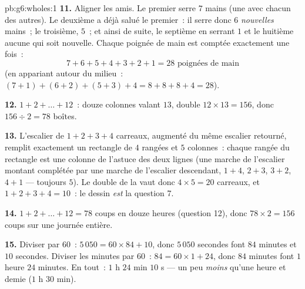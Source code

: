 \begin{solution}{pb:g6:wholes:1}
\textbf{11.} Aligner les amis. Le premier serre $7$ mains (une avec
chacun des autres). Le deuxième a déjà salué le premier~: il serre
donc $6$ \emph{nouvelles} mains~; le troisième, $5$~; et ainsi de
suite, le septième en serrant $1$ et le huitième aucune qui soit
nouvelle. Chaque poignée de main est comptée exactement une fois~:
\[
7 + 6 + 5 + 4 + 3 + 2 + 1 = 28 \text{ poignées de main}
\]
(en appariant autour du milieu~: $(7+1) + (6+2) + (5+3) + 4 =
8 + 8 + 8 + 4 = 28$).

\textbf{12.} $1 + 2 + \dots + 12$~: douze colonnes valant $13$, 
double $12 \times 13 = 156$, donc $156 \div 2 = 78$ boîtes.

\textbf{13.} L'escalier de $1 + 2 + 3 + 4$ carreaux, augmenté du même
escalier retourné, remplit exactement un rectangle de $4$ rangées et
$5$ colonnes~: chaque rangée du rectangle est une colonne de l'astuce
des deux lignes (une marche de l'escalier montant complétée par une
marche de l'escalier descendant, $1 + 4$, $2 + 3$, $3 + 2$, $4 + 1$
--- toujours $5$). Le double de la  vaut donc
$4 \times 5 = 20$ carreaux, et $1 + 2 + 3 + 4 = 10$~: le dessin
\emph{est} la question 7.

\textbf{14.} $1 + 2 + \dots + 12 = 78$ coups en douze heures
(question 12), donc $78 \times 2 = 156$ coups sur une journée
entière.

\textbf{15.} Diviser par $60$~: $5\,050 = 60 \times 84 + 10$, donc
$5\,050$ secondes font $84$ minutes et $10$ secondes. Diviser les
minutes par $60$~: $84 = 60 \times 1 + 24$, donc $84$ minutes font
$1$ heure $24$ minutes. En tout~: $1$ h $24$ min $10$ s --- un peu
\emph{moins} qu'une heure et demie ($1$ h $30$ min).
\end{solution}
